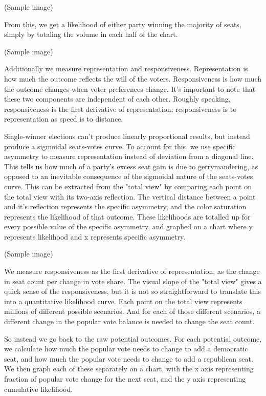 \documentclass[preprint,12pt]{article}
\begin{document}
(Sample image)

From this, we get a likelihood of either party winning the majority of seats, simply by totaling the volume in each half of the chart. 

(Sample image)

Additionally we measure representation and responsiveness.  Representation is how much the outcome reflects the will of the voters.  Responsiveness is how much the outcome changes when voter preferences change.  It's important to note that these two components are independent of each other.  Roughly speaking, responsiveness is the first derivative of representation; responsiveness is to representation as speed is to distance.

Single-winner elections can't produce linearly proportional results, but instead produce a sigmoidal seats-votes curve.  To account for this, we use specific asymmetry to measure representation instead of deviation from a diagonal line.  This tells us how much of a party's excess seat gain is due to gerrymandering, as opposed to an inevitable consequence of  the sigmoidal nature of the seats-votes curve.  This can be extracted from the "total view" by comparing each point on the total view with its two-axis reflection.  The vertical distance between a point and it's reflection represents the specific asymmetry, and the color saturation represents the likelihood of that outcome.  These likelihoods are totalled up for every possible value of the specific asymmetry, and graphed on a chart where y represents likelihood and x represents specific asymmetry.

(Sample image)

We measure responsiveness as the first derivative of representation; as the change in seat count per change in vote share.   The visual slope of the "total view" gives a quick sense of the responsiveness, but it is not so straightforward to translate this into a quantitative likelihood curve.  Each point on the total view represents millions of different possible scenarios.  And for each of those different scenarios, a different change in the popular vote balance is needed to change the seat count. 

So instead we go back to the raw potential outcomes.  For each potential outcome, we calculate how much the popular vote needs to change to add a democratic seat, and how much the popular vote needs to change to add a republican seat.  We then graph each of these separately on a chart, with the x axis representing fraction of popular vote change for the next seat, and the y axis representing cumulative likelihood.
\end{document}
